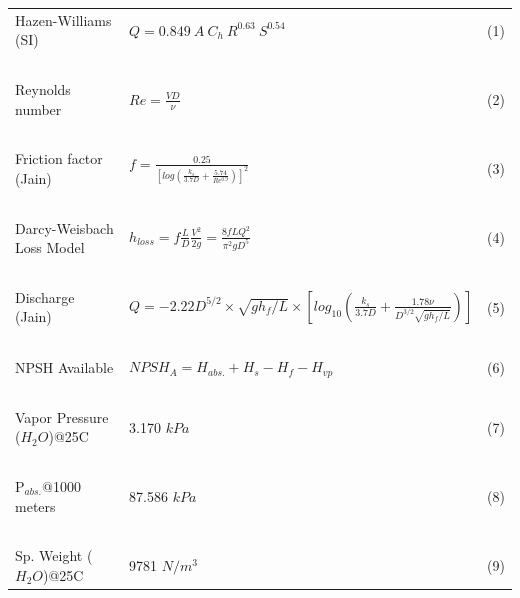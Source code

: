 \documentclass[11pt]{article}
\begin{document}
\begin{tabular}{p{2in} p{4in} p{0.5in}}
Hazen-Williams (SI) & $Q = 0.849~A~C_h~R^{0.63}~S^{0.54}$ & (1) \\
~&~&~\\
Reynolds number & ${Re}=\frac{VD}{\nu}$ & (2) \\
~&~&~\\
Friction factor (Jain) & $f = \frac{0.25}{[log(\frac{k_s}{3.7D} + \frac{5.74}{Re^{0.9}})]^2} $ & (3) \\
~&~&~\\
Darcy-Weisbach Loss Model & $h_{loss}=f\frac{L}{D}\frac{V^2}{2g} = \frac{8fLQ^2}{\pi^2gD^5} $& (4) \\
~&~&~\\
Discharge (Jain) & $ Q=-2.22D^{5/2} \times \sqrt{gh_f/L}\times[log_{10} (\frac{k_s}{3.7D} + \frac{1.78\nu}{D^{3/2}\sqrt{gh_f/L}} )] $ & (5) \\
~&~&~\\
NPSH Available & $NPSH_A = H_{abs.} + H_s -H_f - H_{vp} $& (6) \\
~&~&~\\
Vapor Pressure ($H_2O$)@25C & 3.170 $kPa$ & (7) \\
~&~&~\\
P$_{abs.}$@1000 meters & 87.586 $kPa$ & (8) \\
~ & ~ & ~ \\
Sp. Weight ($H_2O$)@25C & 9781 $N/m^3$ & (9) \\

\end{tabular}
\\
\end{document}
